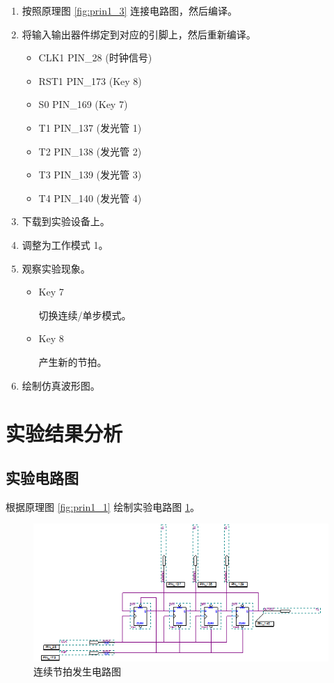 \begin{enumerate}
    \item 按照原理图 \ref{fig:prin1_3} 连接电路图，然后编译。
    \item 将输入输出器件绑定到对应的引脚上，然后重新编译。
    
    \begin{itemize}
        \item CLK1 PIN\_28 (时钟信号)
        \item RST1 PIN\_173 (Key 8)
        \item S0 PIN\_169 (Key 7)
        \item T1 PIN\_137 (发光管 1)
        \item T2 PIN\_138 (发光管 2)
        \item T3 PIN\_139 (发光管 3)
        \item T4 PIN\_140 (发光管 4)
    \end{itemize}
    
    \item 下载到实验设备上。
    \item 调整为工作模式 1。
    \item 观察实验现象。
    
    \begin{itemize}
        \item Key 7
        
        切换连续/单步模式。
        
        \item Key 8
        
        产生新的节拍。
        
    \end{itemize}
    \item 绘制仿真波形图。
    
\end{enumerate}

\section{实验结果分析}

\subsection{实验电路图}

根据原理图 \ref{fig:prin1_1} 绘制实验电路图 \ref{fig:bdf1_1}。

\begin{figure}[H]
\centering
\includegraphics[width=\textwidth]{images/bdf1_1.png}
\caption{连续节拍发生电路图}
\label{fig:bdf1_1}
\end{figure}

